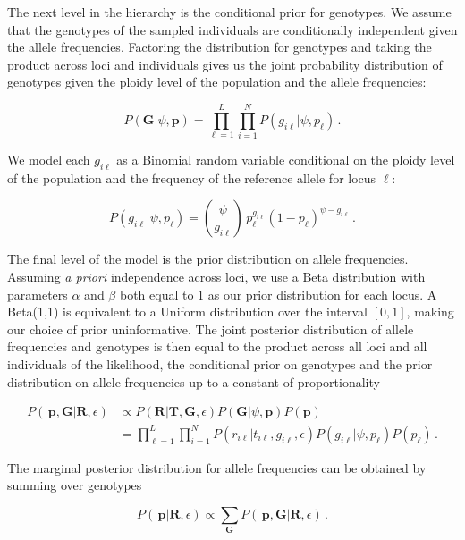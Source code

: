 \documentclass[11pt,english,letterpaper,oneside]{article}
\begin{document}
The next level in the hierarchy is the conditional prior for genotypes. We assume that the genotypes of the sampled individuals are conditionally independent given the allele frequencies. Factoring the distribution for genotypes and taking the product across loci and individuals gives us the joint probability distribution of genotypes given the ploidy level of the population and the allele frequencies:

\begin{equation}\label{condl_prior}
P(\bm{G}|\psi, \bm{p}) = \displaystyle\prod_{\ell=1}^L\displaystyle\prod_{i=1}^N P(g_{i \ell}|\psi, p_{\ell})\,.
\end{equation}

\noindent We model each $g_{i \ell}$ as a Binomial random variable conditional on the ploidy level of the population and the frequency of the reference allele for locus $\ell$:

\begin{equation*}
P(g_{i \ell}|\psi,p_{\ell}) = \binom{\psi}{g_{i \ell}}\,p_{\ell}^{g_{i \ell}}(1-p_{\ell})^{\psi-g_{i \ell}}\,.
\end{equation*}

The final level of the model is the prior distribution on allele frequencies. Assuming \textit{a priori} independence across loci, we use a Beta distribution with parameters $\alpha$ and $\beta$ both equal to $1$ as our prior distribution for each locus. A Beta(1,1) is equivalent to a Uniform distribution over the interval $[0,1]$, making our choice of prior uninformative. The joint posterior distribution of allele frequencies and genotypes is then equal to the product across all loci and all individuals of the likelihood, the conditional prior on genotypes and the prior distribution on allele frequencies up to a constant of proportionality

\begin{align}\label{posterior}
P(\,\bm{p},\bm{G}|\bm{R},\epsilon) &\propto P(\bm{R}|\bm{T},\bm{G}, \epsilon)P(\bm{G}|\psi,\bm{p})P(\bm{p}) \nonumber \\[0.05in]
&= \displaystyle\prod_{\ell=1}^L\displaystyle\prod_{i=1}^N P(r_{i \ell}|t_{i\ell}, g_{i \ell},\epsilon)P(g_{i \ell}|\psi, p_{\ell})P(p_{\ell})\,.
\end{align}

\noindent The marginal posterior distribution for allele frequencies can be obtained by summing over genotypes

\begin{equation}\label{marg_post_p}
P(\,\bm{p}|\bm{R},\epsilon) \propto \displaystyle\sum_{\bm{G}} P(\,\bm{p},\bm{G}|\bm{R},\epsilon)\,.
\end{equation}
\end{document}
